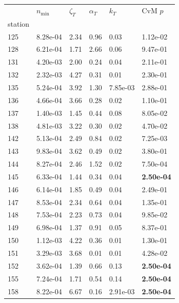 \begin{figure}[htbp!]
{\begin{minipage}[t]{0.48\linewidth}
        \begin{tabular}{llllll}
        \toprule
         & $n_{\min}$ & $\zeta_T$ & $\alpha_T$ & $k_T$ & CvM $p$ \\
        station &  &  &  &  &  \\
        \midrule
                    125 & 8.28e-04 & 2.34 & 0.96 & 0.03 & 1.12e-02\\
                    128 & 6.21e-04 & 1.71 & 2.66 & 0.06 & 9.47e-01\\
                    131 & 4.20e-03 & 2.00 & 0.24 & 0.04 & 2.11e-01\\
                    132 & 2.32e-03 & 4.27 & 0.31 & 0.01 & 2.30e-01\\
                    135 & 5.24e-04 & 3.92 & 1.30 & 7.85e-03 & 2.88e-01\\
                    136 & 4.66e-04 & 3.66 & 0.28 & 0.02 & 1.10e-01\\
                    137 & 1.40e-03 & 1.45 & 0.44 & 0.08 & 8.05e-02\\
                    138 & 4.81e-03 & 3.22 & 0.30 & 0.02 & 4.70e-02\\
                    142 & 5.13e-04 & 2.49 & 0.84 & 0.02 & 7.25e-03\\
                    143 & 9.83e-04 & 3.62 & 0.49 & 0.02 & 3.80e-01\\
                    144 & 8.27e-04 & 2.46 & 1.52 & 0.02 & 7.50e-04\\
                    145 & 6.33e-04 & 1.44 & 0.34 & 0.04 & \textbf{2.50e-04}\\
                    146 & 6.14e-04 & 1.85 & 0.49 & 0.04 & 2.49e-01\\
                    147 & 8.53e-04 & 2.34 & 0.64 & 0.04 & 1.35e-01\\
                    148 & 7.53e-04 & 2.23 & 0.73 & 0.04 & 9.85e-02\\
                    149 & 6.98e-04 & 1.37 & 0.91 & 0.05 & 8.37e-01\\
                    150 & 1.12e-03 & 4.22 & 0.36 & 0.01 & 1.30e-01\\
                    151 & 3.29e-03 & 3.68 & 0.01 & 0.01 & 4.28e-02\\
                    152 & 3.62e-04 & 1.39 & 0.66 & 0.13 & \textbf{2.50e-04}\\
                    155 & 7.24e-04 & 1.71 & 0.54 & 0.14 & \textbf{2.50e-04}\\
                    158 & 8.22e-04 & 6.67 & 0.16 & 2.91e-03 & \textbf{2.50e-04}\\

\end{tabular}
\end{minipage}}
\end{figure}
